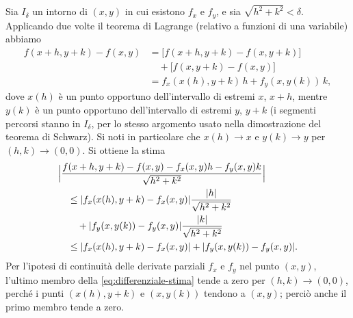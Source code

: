 \begin{dimostrazione}
Sia $I_{\delta}$ un intorno di $(x,y)$ in cui esistono $f_{x}$ e $f_{y}$, e sia
$\sqrt{h^{2}+k^{2}}<\delta$. Applicando due volte il teorema di Lagrange (relativo a funzioni
di una variabile) abbiamo
\begin{equation}\label{eq:differenziale-lagrange}
\begin{split}
  f(x+h,y+k)-f(x,y)&=\bigl[f(x+h,y+k)-f(x,y+k)\bigr]\\
  &\quad+\bigl[f(x,y+k)-f(x,y)\bigr]\\
  &=f_{x}(x(h),y+k)\,h+f_{y}(x,y(k))\,k,
\end{split}
\end{equation}
dove $x(h)$ è un punto opportuno dell'intervallo di estremi $x$, $x+h$, mentre $y(k)$ è un
punto opportuno dell'intervallo di estremi $y$, $y+k$ (i segmenti percorsi stanno in
$I_{\delta}$, per lo stesso argomento usato nella dimostrazione del teorema di
Schwarz). Si noti in particolare che $x(h)\to x$ e $y(k)\to y$ per $(h,k)\to(0,0)$. Si
ottiene la stima
\begin{equation}\label{eq:differenziale-stima}
\begin{split}
  &\Bigl|\frac{f(x+h,y+k)-f(x,y)-f_{x}(x,y)h-f_{y}(x,y)k}{\sqrt{h^{2}+k^{2}}}\Bigr|\\
  &\quad\le\lvert f_{x}(x(h),y+k)-f_{x}(x,y)\rvert\frac{\lvert h\rvert}{\sqrt{h^{2}+k^{2}}}\\
  &\qquad+\lvert f_{y}(x,y(k))-f_{y}(x,y)\rvert\frac{\lvert k\rvert}{\sqrt{h^{2}+k^{2}}}\\
  &\quad\le\lvert f_{x}(x(h),y+k)-f_{x}(x,y)\rvert+\lvert f_{y}(x,y(k))-f_{y}(x,y)\rvert .
\end{split}
\end{equation}
Per l'ipotesi di continuità delle derivate parziali $f_{x}$ e $f_{y}$ nel punto $(x,y)$,
l'ultimo membro della \eqref{eq:differenziale-stima} tende a zero per $(h,k)\to(0,0)$,
perché i punti $(x(h),y+k)$ e $(x,y(k))$ tendono a $(x,y)$; perciò anche il primo membro
tende a zero.
\end{dimostrazione}

